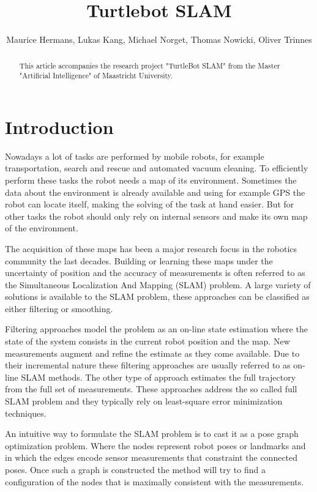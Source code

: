 \documentclass{ba-kecs}
\title{Turtlebot SLAM }
\author{Maurice Hermans, Lukas Kang, Michael Norget, Thomas Nowicki, Oliver Trinnes}
\begin{document}
\maketitle

\begin{abstract}
This article accompanies the research project "TurtleBot SLAM" from the Master "Artificial Intelligence" of Maastricht University.
\end{abstract}

\section{Introduction}
Nowadays a lot of tasks are performed by mobile robots, for example transportation, search and rescue and automated vacuum cleaning. To efficiently perform these tasks the robot needs a map of its environment. Sometimes the data about the environment is already available and using for example GPS the robot can locate itself, making the solving of the task at hand easier. But for other tasks the robot should only rely on internal sensors and make its own map of the environment.

The acquisition of these maps has been a major research focus in the robotics community the last decades. Building or learning these maps under the uncertainty of position and the accuracy of measurements is often referred to as the Simultaneous Localization And Mapping (SLAM) problem. A large variety of solutions is available to the SLAM problem, these approaches can be classified as either filtering or smoothing.

Filtering approaches model the problem as an on-line state estimation where the state of the system consists in the current robot position and the map. New measurements augment and refine the estimate as they come available. Due to their incremental nature these filtering approaches are usually referred to as on-line SLAM methods. The other type of approach estimates the full trajectory from the full set of measurements. These approaches address the so called full SLAM problem and they typically rely on least-square error minimization techniques.

An intuitive way to formulate the SLAM problem is to cast it as a pose graph optimization problem. Where the nodes represent robot poses or landmarks and in which the edges encode sensor measurements that constraint the connected poses. Once such a graph is constructed the method will try to find a configuration of the nodes that is maximally consistent with the measurements.
\end{document}
